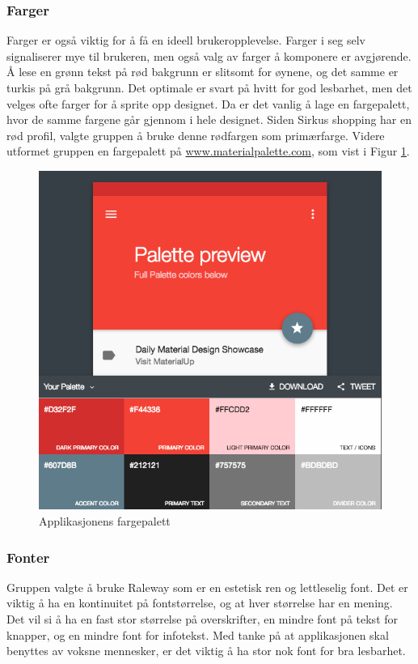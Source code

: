 \subsubsection{Farger}
Farger er også viktig for å få en ideell brukeropplevelse. Farger i seg selv signaliserer mye til brukeren, men også valg av farger å komponere er avgjørende. Å lese en grønn tekst på rød bakgrunn er slitsomt for øynene, og det samme er turkis på grå bakgrunn\cite{esthetics}. Det optimale er svart på hvitt for god lesbarhet, men det velges ofte farger for å sprite opp designet. Da er det vanlig å lage en fargepalett, hvor de samme fargene går gjennom i hele designet. Siden Sirkus shopping har en rød profil, valgte gruppen å bruke denne rødfargen som primærfarge. Videre utformet gruppen en fargepalett på \textcolor[HTML]{0000FF}{\underline{www.materialpalette.com}}, som vist i Figur \ref{fig:fargepalett}.

\begin{figure}[H]
\includegraphics[scale=0.65]{images/colors.png}
\centering %
\caption{Applikasjonens fargepalett}
\label{fig:fargepalett}
\end{figure}

\subsubsection{Fonter}
Gruppen valgte å bruke Raleway som er en estetisk ren og lettleselig font. Det er viktig å ha en kontinuitet på fontstørrelse, og at hver størrelse har en mening. Det vil si å ha en fast stor størrelse på overskrifter, en mindre font på tekst for knapper, og en mindre font for infotekst. Med tanke på at applikasjonen skal benyttes av voksne mennesker, er det viktig å ha stor nok font for bra lesbarhet.

